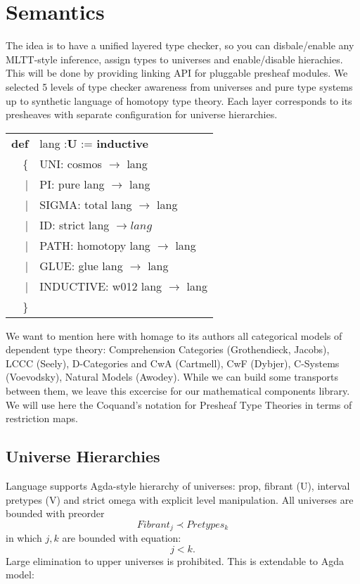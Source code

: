 \documentclass{article}
\theoremstyle{definition}
\newcommand{\tabstyle}[0]{\scriptsize\ttfamily\fontseries{l}\selectfont}
\begin{document}
\newpage
\section{Semantics}
The idea is to have a unified layered type checker, so you can disbale/enable any MLTT-style inference,
assign types to universes and enable/disable hierachies. This will be done by providing linking API for
pluggable presheaf modules. We selected 5 levels of type checker awareness from universes and pure type
systems up to synthetic language of homotopy type theory. Each layer corresponds to its presheaves with
separate configuration for universe hierarchies.
\begin{table}[ht]
\tabstyle
\begin{tabular}{rl}
     \textbf{def} & lang :\textbf{U} := \textbf{inductive} \\
               \{ & UNI: cosmos $\rightarrow$ lang \\
               |  & PI: pure lang $\rightarrow$ lang \\
               |  & SIGMA: total lang $\rightarrow$ lang \\
               |  & ID: strict lang $\rightarrow lang$ \\
               |  & PATH: homotopy lang $\rightarrow$ lang \\
               |  & GLUE: glue lang $\rightarrow$ lang \\
               |  & INDUCTIVE: w012 lang $\rightarrow$ lang \\
               \} & \\
\end{tabular}
\end{table}
We want to mention here with homage to its authors all categorical models of dependent type theory:
Comprehension Categories (Grothendieck, Jacobs), LCCC (Seely), D-Categories and CwA (Cartmell),
CwF (Dybjer), C-Systems (Voevodsky), Natural Models (Awodey). While we can build some transports
between them, we leave this excercise for our mathematical components library.
We will use here the Coquand's notation for Presheaf Type Theories in terms of restriction maps.

\subsection{Universe Hierarchies}

Language supports Agda-style hierarchy of universes: prop, fibrant (U), interval pretypes (V) and
strict omega with explicit level manipulation. All universes are bounded with preorder
\begin{equation}
Fibrant_j \prec Pretypes_k
\end{equation}
in which $j,k$ are bounded with equation:
\begin{equation}
j < k.
\end{equation}
Large elimination to upper universes is prohibited. This is extendable to Agda model:
\end{document}
